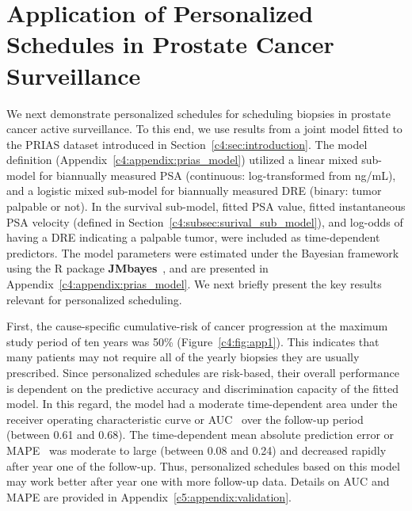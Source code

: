 \section{Application of Personalized Schedules in Prostate Cancer Surveillance}
\label{c4:sec:results}
We next demonstrate personalized schedules for scheduling biopsies in prostate cancer active surveillance. To this end, we use results from a joint model fitted to the PRIAS dataset introduced in Section~\ref{c4:sec:introduction}. The model definition (Appendix~\ref{c4:appendix:prias_model}) utilized a linear mixed sub-model for biannually measured PSA (continuous: log-transformed from ng/mL), and a logistic mixed sub-model for biannually measured DRE (binary: tumor palpable or not). In the survival sub-model, fitted PSA value, fitted instantaneous PSA velocity (defined in Section~\ref{c4:subsec:surival_sub_model}), and log-odds of having a DRE indicating a palpable tumor, were included as time-dependent predictors. The model parameters were estimated under the Bayesian framework using the R package \textbf{JMbayes}~\citep{rizopoulosJMbayes}, and are presented in Appendix~\ref{c4:appendix:prias_model}. We next briefly present the key results relevant for personalized scheduling.

First, the cause-specific cumulative-risk of cancer progression at the maximum study period of ten years was 50\% (Figure~\ref{c4:fig:app1}). This indicates that many patients may not require all of the yearly biopsies they are usually prescribed. Since personalized schedules are risk-based, their overall performance is dependent on the predictive accuracy and discrimination capacity of the fitted model. In this regard, the model had a moderate time-dependent area under the receiver operating characteristic curve or AUC~\citep{landmarking2017} over the follow-up period (between 0.61 and 0.68). The time-dependent mean absolute prediction error or MAPE~\citep{landmarking2017} was moderate to large (between 0.08 and 0.24) and decreased rapidly after year one of the follow-up. Thus, personalized schedules based on this model may work better after year one with more follow-up data. Details on AUC and MAPE are provided in Appendix~\ref{c5:appendix:validation}.

